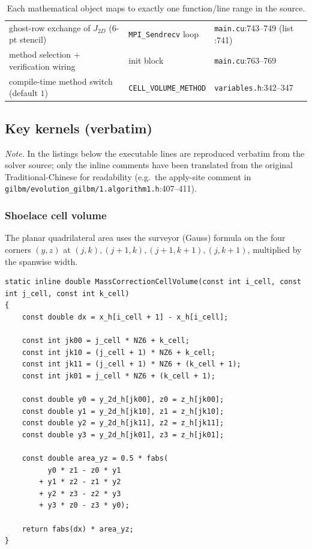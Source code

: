 \documentclass[11pt]{article}
\theoremstyle{definition}
\theoremstyle{remark}
\providecommand{\path}[1]{\texttt{#1}}
\begin{document}
\begin{table}[ht]
{\begin{tabular}{@{}lll@{}}
ghost-row exchange of $J_{2D}$ (6-pt stencil) & \texttt{MPI\_Sendrecv} loop & \path{main.cu}:743--749 (list :741) \\
method selection + verification wiring & init block & \path{main.cu}:763--769 \\
compile-time method switch (default $1$) & \texttt{CELL\_VOLUME\_METHOD} & \path{variables.h}:342--347 \\
\bottomrule
\end{tabular}}
\caption{Each mathematical object maps to exactly one function/line range in the
source.}
\label{tab:corr}
\end{table}

\subsection{Key kernels (verbatim)}
\label{sec:impl:listings}

\noindent\emph{Note.} In the listings below the executable lines are reproduced
verbatim from the solver source; only the inline comments have been translated from
the original Traditional-Chinese for readability (e.g.\ the apply-site comment in
\path{gilbm/evolution\_gilbm/1.algorithm1.h}:407--411).

\subsubsection{Shoelace cell volume}
The planar quadrilateral area uses the surveyor (Gauss) formula on the four corners
$(y,z)$ at $(j,k),(j{+}1,k),(j{+}1,k{+}1),(j,k{+}1)$, multiplied by the spanwise
width.

\begin{lstlisting}[caption={Shoelace cell volume (\texttt{evolution.h}:82--103).}]
static inline double MassCorrectionCellVolume(const int i_cell, const int j_cell, const int k_cell)
{
    const double dx = x_h[i_cell + 1] - x_h[i_cell];

    const int jk00 = j_cell * NZ6 + k_cell;
    const int jk10 = (j_cell + 1) * NZ6 + k_cell;
    const int jk11 = (j_cell + 1) * NZ6 + (k_cell + 1);
    const int jk01 = j_cell * NZ6 + (k_cell + 1);

    const double y0 = y_2d_h[jk00], z0 = z_h[jk00];
    const double y1 = y_2d_h[jk10], z1 = z_h[jk10];
    const double y2 = y_2d_h[jk11], z2 = z_h[jk11];
    const double y3 = y_2d_h[jk01], z3 = z_h[jk01];

    const double area_yz = 0.5 * fabs(
          y0 * z1 - z0 * y1
        + y1 * z2 - z1 * y2
        + y2 * z3 - z2 * y3
        + y3 * z0 - z3 * y0);

    return fabs(dx) * area_yz;
}
\end{lstlisting}
\end{document}
